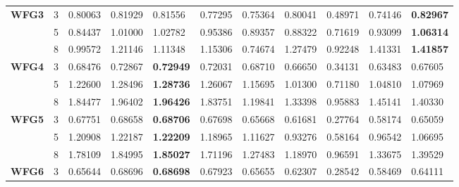 \documentclass[conference]{IEEEtran}
\begin{document}
\begin{table*}[!htb]
\begin{tabular}{|l|l|l|l|l|l|l|l|l|l|l|}
	\textbf{WFG3}    & 3          & 0.80063          & 0.81929           & 0.81556               & 0.77295          & 0.75364             & 0.80041             & 0.48971            & 0.74146              & \textbf{0.82967} \\ \cline{2-11} 
	\textbf{}        & 5          & 0.84437          & 1.01000           & 1.02782               & 0.95386          & 0.89357             & 0.88322             & 0.71619            & 0.93099              & \textbf{1.06314} \\ \cline{2-11} 
	\textbf{}        & 8          & 0.99572          & 1.21146           & 1.11348               & 1.15306          & 0.74674             & 1.27479             & 0.92248            & 1.41331              & \textbf{1.41857} \\ \hline
	\textbf{WFG4}    & 3          & 0.68476          & 0.72867           & \textbf{0.72949}      & 0.72031          & 0.68710             & 0.66650             & 0.34131            & 0.63483              & 0.67605          \\ \cline{2-11} 
	\textbf{}        & 5          & 1.22600          & 1.28496           & \textbf{1.28736}      & 1.26067          & 1.15695             & 1.01300             & 0.71180            & 1.04810              & 1.07969          \\ \cline{2-11} 
	\textbf{}        & 8          & 1.84477          & 1.96402           & \textbf{1.96426}      & 1.83751          & 1.19841             & 1.33398             & 0.95883            & 1.45141              & 1.40330          \\ \hline
	\textbf{WFG5}    & 3          & 0.67751          & 0.68658           & \textbf{0.68706}      & 0.67698          & 0.65668             & 0.61681             & 0.27764            & 0.58174              & 0.65059          \\ \cline{2-11} 
	\textbf{}        & 5          & 1.20908          & 1.22187           & \textbf{1.22209}      & 1.18965          & 1.11627             & 0.93276             & 0.58164            & 0.96542              & 1.06695          \\ \cline{2-11} 
	\textbf{}        & 8          & 1.78109          & 1.84995           & \textbf{1.85027}      & 1.71196          & 1.27483             & 1.18970             & 0.96591            & 1.33675              & 1.39529          \\ \hline
	\textbf{WFG6}    & 3          & 0.65644          & 0.68696           & \textbf{0.68698}      & 0.67923          & 0.65655             & 0.62307             & 0.28542            & 0.58469              & 0.64111          \\ \cline{2-11} 

\end{tabular}
\end{table*}
\end{document}
